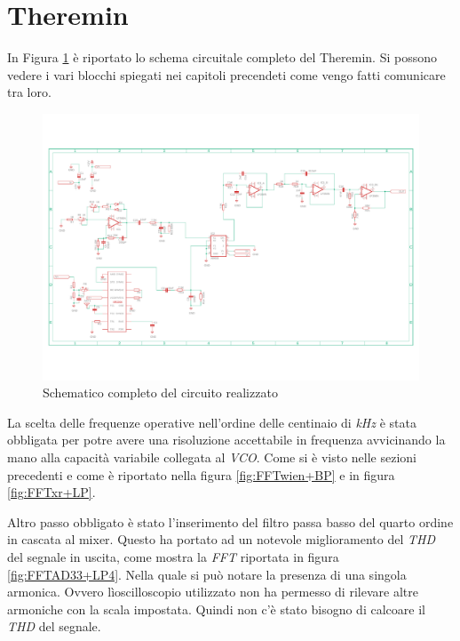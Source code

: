 \documentclass[titlepage]{report}
\begin{document}
\newpage
\section{Theremin}
\label{ch:Teremin}
	In Figura \ref{fig:Schematico Completo} è riportato lo schema circuitale completo del Theremin. Si possono vedere i vari blocchi spiegati nei capitoli precendeti come vengo fatti comunicare tra loro.

	\begin{figure}[H]
		\centering
		\includegraphics[scale=0.4]{Immagini/Schematico Completo.pdf}
		\caption{Schematico completo del circuito realizzato}
		\label{fig:Schematico Completo}
	\end{figure}



	La scelta delle frequenze operative nell'ordine delle centinaio di \textit{kHz} è stata obbligata per potre avere una risoluzione accettabile in frequenza avvicinando la mano alla capacità variabile collegata al \textit{VCO}.
	Come si è visto nelle sezioni precedenti e come è riportato nella figura \ref{fig:FFTwien+BP} e in figura \ref{fig:FFTxr+LP}.

	Altro passo obbligato è stato l'inserimento del filtro passa basso del quarto ordine in cascata al mixer. Questo ha portato ad un notevole miglioramento del \textit{THD} del segnale in uscita, come mostra la \textit{FFT} riportata in figura \ref{fig:FFTAD33+LP4}. Nella quale si può notare la presenza di una singola armonica. Ovvero lìoscilloscopio utilizzato non ha permesso di rilevare altre armoniche con la scala impostata. Quindi non c'è stato bisogno di calcoare il \textit{THD} del segnale.
	
\end{document}
